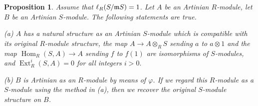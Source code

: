 \documentclass[a4papersize]{article}
\newtheorem{proposition}[theorem]{Proposition}
\DeclareMathOperator{\Hom}{Hom}
\DeclareMathOperator{\Ext}{Ext}
\begin{document}
\begin{proposition}  \label{P:1b} Assume that $\ell_R(S/\frak mS)=1$. Let $A$ be an Artinian $R$-module, let $B$ be an Artinian $S$-module. The following statements are true. 

(a) $A$ has a natural structure as an Artinian $S$-module which is compatible with its original $R$-module structure, the map $A\rightarrow A\otimes_RS$ sending $a$ to $a\otimes 1$ and the map $\Hom_R(S, A)\to A$ sending $f$ to $f(1)$ are isomorphisms of $S$-modules, and $\Ext^i_R(S, A)=0$ for all integers $i>0.$

(b) $B$ is Artinian as an $R$-module by means of $\varphi$.  If we regard this $R$-module as a $S$-module using the method in (a), then  we recover the original $S$-module structure on $B$. 
\end{proposition}
\end{document}
